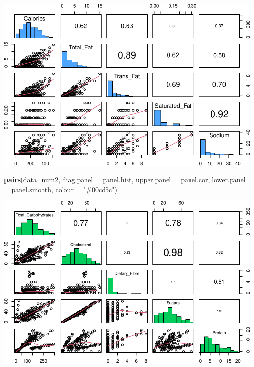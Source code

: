 \documentclass[
]{article}
\newenvironment{Shaded}{\begin{snugshade}}{\end{snugshade}}
\newcommand{\AttributeTok}[1]{\textcolor[rgb]{0.13,0.29,0.53}{#1}}
\newcommand{\FunctionTok}[1]{\textcolor[rgb]{0.13,0.29,0.53}{\textbf{#1}}}
\newcommand{\NormalTok}[1]{#1}
\newcommand{\StringTok}[1]{\textcolor[rgb]{0.31,0.60,0.02}{#1}}
\begin{document}
\begin{center}\includegraphics{Statistical_Learning_Final_Report_files/figure-latex/pairplot-1} \end{center}

\begin{Shaded}
\begin{Highlighting}[]
\FunctionTok{pairs}\NormalTok{(data\_num2, }
      \AttributeTok{diag.panel =}\NormalTok{ panel.hist,}
      \AttributeTok{upper.panel =}\NormalTok{ panel.cor,}
      \AttributeTok{lower.panel =}\NormalTok{ panel.smooth,}
      \AttributeTok{colour =} \StringTok{"\#00cd5c"}\NormalTok{)}
\end{Highlighting}
\end{Shaded}

\begin{center}\includegraphics{Statistical_Learning_Final_Report_files/figure-latex/pairplot-2} \end{center}
\end{document}
